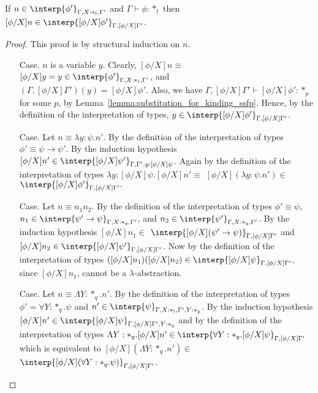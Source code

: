 \begin{lemma}
  If $n \in \interp{\phi'}_{\Gamma,X:*_l,\Gamma'}$ and 
  $\Gamma \vdash \phi:*_l$ then 
  $[\phi/X]n \in \interp{[\phi/X]\phi'}_{\Gamma,[\phi/X]\Gamma'}$.
  \label{lemma:type_sub_ssfp}
\end{lemma}
\begin{proof}
  This proof is by structural induction on $n$.
\begin{itemize}
\item[Case.] $n$ is a variable $y$.  Clearly, $[\phi/X]n \equiv $
  $[\phi/X]y = y \in \interp{\phi'}_{\Gamma,X:*_l,\Gamma'}$, and\\
  $(\Gamma,[\phi/X]\Gamma')(y) = [\phi/X]\phi'$. Also,
  we have $\Gamma,[\phi/X]\Gamma' \vdash [\phi/X]\phi':*_p$ for some $p$, by 
  Lemma~\ref{lemma:substitution_for_kinding_ssfp}. Hence,
  by the definition of the interpretation of types, 
  $y \in \interp{[\phi/X]\phi'}_{\Gamma,[\phi/X]\Gamma'}$.
  
\item[Case.] Let $n \equiv \lambda y:\psi.n'$.  By the definition of the
  interpretation of types $\phi' \equiv \psi \rightarrow \psi'$.  
  By the induction hypothesis 
  $[\phi/X]n' \in \interp{[\phi/X]\psi'}_{\Gamma,\Gamma',y:[\phi/X]\psi}$. 
  Again by the definition of the interpretation of types
  $\lambda y:[\phi/X]\psi.[\phi/X]n' \equiv $
  $[\phi/X](\lambda y:\psi.n') \in $
  $\interp{[\phi/X]\phi'}_{\Gamma,[\phi/X]\Gamma'}.$
  
\item[Case.]  Let $n \equiv n_1n_2$.  By the definition of the 
  interpretation of types $\phi' \equiv \psi$, 
  $n_1 \in \interp{\psi' \rightarrow \psi}_{\Gamma,X:*_q,\Gamma'}$, and
  $n_2 \in \interp{\psi'}_{\Gamma,X:*_q,\Gamma'}$.  By the induction hypothesis 
  $[\phi/X]n_1 \in $
  $\interp{[\phi/X](\psi' \rightarrow \psi)}_{\Gamma,[\phi/X]\Gamma'}$ and
  $[\phi/X]n_2 \in \interp{[\phi/X]\psi'}_{\Gamma,[\phi/X]\Gamma'}$.  Now by
  the definition of the interpretation of types 
  $([\phi/X]n_1)([\phi/X]n_2) \in \interp{[\phi/X]\psi}_{\Gamma,[\phi/X]\Gamma'}$,
  since $[\phi/X]n_1$, cannot be a $\lambda$-abstraction.
  
\item[Case.]  Let $n \equiv \Lambda Y:*_q.n'$.  By the definition of the
  interpretation of types $\phi' = \forall Y:*_q.\psi$ and 
  $n' \in \interp{\psi}_{\Gamma,X:*_l,\Gamma',Y:*_q}$.  By the induction 
  hypothesis \\
  $[\phi/X]n' \in \interp{[\phi/X]\psi}_{\Gamma,[\phi/X]\Gamma',Y:*_q}$ and by
  the definition of the interpretation of types 
  $\Lambda Y:*_q.[\phi/X]n' \in 
  \interp{\forall Y:*_q.[\phi/X]\psi}_{\Gamma,[\phi/X]\Gamma'}$ which is 
  equivalent to
  $[\phi/X](\Lambda Y:*_q.n') \in $
  $\interp{[\phi/X](\forall Y:*_q.\psi)}_{\Gamma,[\phi/X]\Gamma'}$.
  

\end{itemize}
\end{proof}
